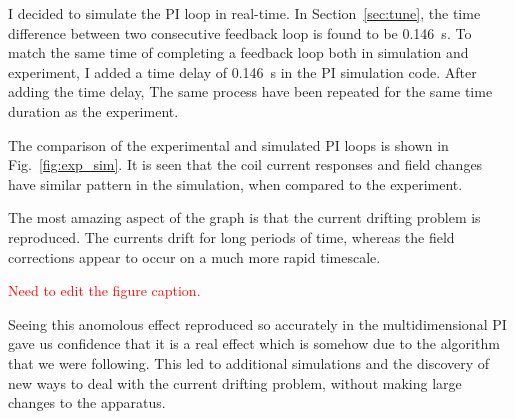 I decided to simulate the PI loop in real-time.  In
Section~\ref{sec:tune}, the time difference between two consecutive
feedback loop is found to be 0.146~s. To match the same time of
completing a feedback loop both in simulation and experiment, I added
a time delay of 0.146~s in the PI simulation code. After adding the
time delay, The same process have been repeated for the same time
duration as the experiment.

The comparison of the experimental and simulated PI loops is shown in
Fig.~\ref{fig:exp_sim}.  It is seen that the coil current responses
and field changes have similar pattern in the simulation, when
compared to the experiment.

The most amazing aspect of the graph is that the current drifting
problem is reproduced.  The currents drift for long periods of time,
whereas the field corrections appear to occur on a much more rapid
timescale.

\textcolor{red}{Need to edit the figure caption.}


Seeing this anomolous effect reproduced so accurately in the
multidimensional PI gave us confidence that it is a real effect which
is somehow due to the algorithm that we were following.  This led to
additional simulations and the discovery of new ways to deal with the
current drifting problem, without making large changes to the
apparatus.


